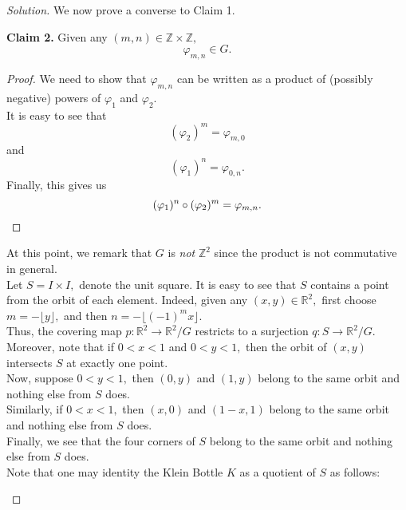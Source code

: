 \documentclass[12pt]{article}
\theoremstyle{definition}
\numberwithin{thm}{section}
\newenvironment{blockquote}
{\begin{mdframed}[skipabove=0pt, skipbelow=0pt, innertopmargin=4pt, innerbottommargin=4pt, bottomline=false,topline=false,rightline=false, linewidth=2pt]}
{\end{mdframed}}
\newenvironment{soln}{\begin{proof}[Solution]}{\end{proof}}
\begin{document}
\begin{soln}
		We now prove a converse to Claim 1.
		\begin{blockquote}
			\textbf{Claim 2.} Given any $(m, n) \in \mathbb{Z}\times\mathbb{Z},$ 
			\begin{equation*} 
				\varphi_{m, n} \in G.
			\end{equation*}
			\begin{proof} 
				We need to show that $\varphi_{m, n}$ can be written as a product of (possibly negative) powers of $\varphi_1$ and $\varphi_2.$\\
				It is easy to see that
				\begin{equation*} 
					(\varphi_2)^m = \varphi_{m, 0}
				\end{equation*}
				and
				\begin{equation*} 
					(\varphi_1)^n = \varphi_{0, n}.
				\end{equation*}
				Finally, this gives us
				\begin{equation*} 
					(\varphi_1)^n\circ(\varphi_2)^m = \varphi_{m, n}. \qedhere
				\end{equation*}
			\end{proof}
		\end{blockquote}
		At this point, we remark that $G$ is \emph{not} $\mathbb{Z}^2$ since the product is not commutative in general.\\
		Let $S = I \times I,$ denote the unit square. It is easy to see that $S$ contains a point from the orbit of each element. Indeed, given any $(x, y) \in \mathbb{R}^2,$ first choose $m = -\lfloor y \rfloor,$ and then $n = -\lfloor (-1)^mx \rfloor.$\\
		Thus, the covering map $p:\mathbb{R}^2 \to \mathbb{R}^2/G$ restricts to a surjection $q:S \to \mathbb{R}^2/G.$\\
		Moreover, note that if $0 < x < 1$ and $0 < y < 1,$ then the orbit of $(x, y)$ intersects $S$ at exactly one point.\\
		Now, suppose $0 < y < 1,$ then $(0, y)$ and $(1, y)$ belong to the same orbit and nothing else from $S$ does.\\
		Similarly, if $0 < x < 1,$ then $(x, 0)$ and $(1 - x, 1)$ belong to the same orbit and nothing else from $S$ does.\\
		Finally, we see that the four corners of $S$ belong to the same orbit and nothing else from $S$ does.\\
		Note that one may identity the Klein Bottle $K$ as a quotient of $S$ as follows:
		\begin{center}
			\begin{tikzpicture}

\end{tikzpicture}
\end{center}
\end{soln}
\end{document}
